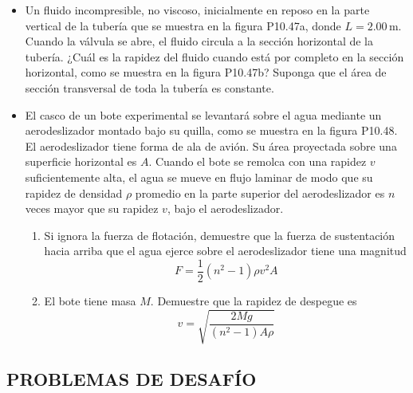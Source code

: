 \documentclass[11pt,a4paper]{article}
\begin{document}
\begin{itemize}
    \vspace*{9cm}
\end{itemize}

\newpage

\begin{itemize}
    \item[\textbf{47.}] Un fluido incompresible, no viscoso, inicialmente en reposo en la parte vertical de la tubería que se muestra en la figura P10.47a, donde \(L = 2.00\,\text{m}\). Cuando la válvula se abre, el fluido circula a la sección horizontal de la tubería. ¿Cuál es la rapidez del fluido cuando está por completo en la sección horizontal, como se muestra en la figura P10.47b? Suponga que el área de sección transversal de toda la tubería es constante.
    
    \vspace*{7cm}
    
    \item[\textbf{48.}] El casco de un bote experimental se levantará sobre el agua mediante un aerodeslizador montado bajo su quilla, como se muestra en la figura P10.48. El aerodeslizador tiene forma de ala de avión. Su área proyectada sobre una superficie horizontal es \(A\). Cuando el bote se remolca con una rapidez \(v\) suficientemente alta, el agua se mueve en flujo laminar de modo que su rapidez de densidad \(\rho\) promedio en la parte superior del aerodeslizador es \(n\) veces mayor que su rapidez \(v\), bajo el aerodeslizador.
    \begin{enumerate}
        \item Si ignora la fuerza de flotación, demuestre que la fuerza de sustentación hacia arriba que el agua ejerce sobre el aerodeslizador tiene una magnitud
        \[
        F = \frac{1}{2} (n^2 - 1) \rho v^2 A
        \]
        \item El bote tiene masa \(M\). Demuestre que la rapidez de despegue es
        \[
        v = \sqrt{\frac{2Mg}{(n^2 - 1)A\rho}}
        \]
    \end{enumerate}
    
    \vspace*{8cm}
\end{itemize}

\newpage

\subsection*{PROBLEMAS DE DESAFÍO}
\end{document}
